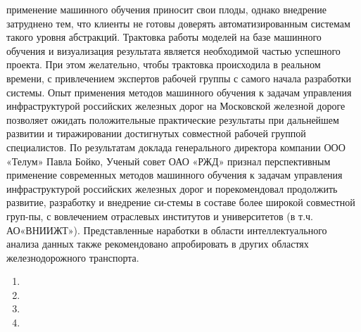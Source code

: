 применение машинного обучения приносит свои плоды, однако внедрение затруднено тем, что клиенты не готовы доверять автоматизированным системам такого уровня абстракций. Трактовка работы моделей на базе машинного обучения и визуализация результата является необходимой частью успешного проекта. При этом желательно, чтобы трактовка происходила в реальном времени, с привлечением экспертов рабочей группы с самого начала разработки системы.
Опыт применения методов машинного обучения к задачам управления инфраструктурой российских железных дорог на Московской железной дороге  позволяет  ожидать  положительные  практические результаты при дальнейшем развитии и тиражировании достигнутых совместной рабочей группой специалистов.
По  результатам  доклада  генерального  директора  компании  ООО «Телум»  Павла  Бойко, Ученый  совет  ОАО «РЖД»  признал  перспективным применение современных методов машинного обучения к задачам управления инфраструктурой российских железных дорог и порекомендовал продолжить развитие, разработку и внедрение си-стемы в составе более широкой совместной груп-пы, с вовлечением отраслевых институтов и университетов (в т.ч. АО«ВНИИЖТ»). Представленные наработки в области интеллектуального анализа данных также рекомендовано апробировать в других областях железнодорожного транспорта.
\begin{enumerate}
  \item {}
  \item {}
  \item {}
  \item {}
\end{enumerate}
